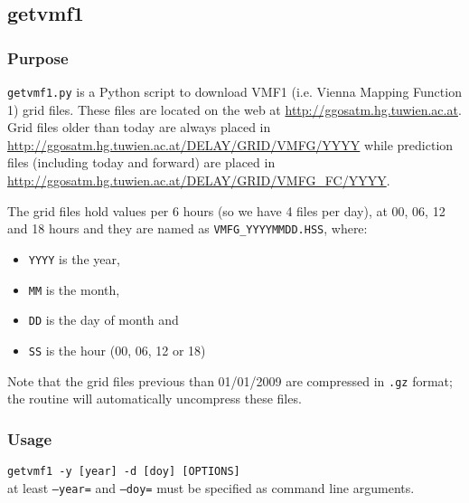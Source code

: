 \subsection{getvmf1}
\label{getvmf1}

\subsubsection{Purpose}
\texttt{getvmf1.py} is a Python script to download VMF1 (i.e. Vienna Mapping Function 1)
grid files. These files are located on the web at \url{http://ggosatm.hg.tuwien.ac.at}.
Grid files older than today are always placed in 
\url{http://ggosatm.hg.tuwien.ac.at/DELAY/GRID/VMFG/YYYY} while prediction files (including
today and forward) are placed in \url{http://ggosatm.hg.tuwien.ac.at/DELAY/GRID/VMFG_FC/YYYY}.

The grid files hold values per 6 hours (so we have 4 files per day), at 00, 06, 12 and 18
hours and they are named as \texttt{VMFG\_YYYYMMDD.HSS}, where:
\begin{itemize}
    \item \texttt{YYYY} is the year,
    \item \texttt{MM} is the month,
    \item \texttt{DD} is the day of month and
    \item \texttt{SS} is the hour (00, 06, 12 or 18)
\end{itemize}

Note that the grid files previous than 01/01/2009 are compressed in \texttt{.gz} format;
the routine will automatically uncompress these files.

\subsubsection{Usage}
\texttt{getvmf1 -y [year] -d [doy] [OPTIONS]}\\
at least \texttt{--year=} and \texttt{--doy=}
must be specified as command line arguments.\\


